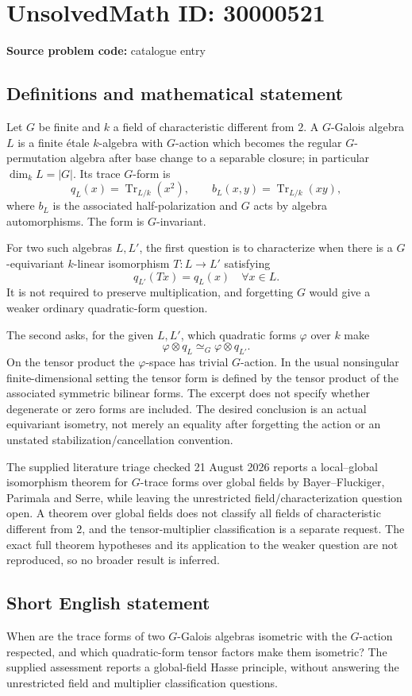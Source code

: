 \documentclass[11pt]{article}
\begin{document}
\section*{UnsolvedMath ID: 30000521}
\textbf{Source problem code:} catalogue entry
\subsection{Definitions and mathematical statement}
Let $G$ be finite and $k$ a field of characteristic different from $2$. A $G$-Galois algebra $L$ is a finite \'etale $k$-algebra with $G$-action which becomes the regular $G$-permutation algebra after base change to a separable closure; in particular $\dim_kL=|G|$. Its trace $G$-form is
\[
 q_L(x)=\operatorname{Tr}_{L/k}(x^2),
 \qquad b_L(x,y)=\operatorname{Tr}_{L/k}(xy),
\]
where $b_L$ is the associated half-polarization and $G$ acts by algebra automorphisms. The form is $G$-invariant.

For two such algebras $L,L'$, the first question is to characterize when there is a $G$-equivariant $k$-linear isomorphism $T:L\to L'$ satisfying
\[
 q_{L'}(T x)=q_L(x)\quad\forall x\in L.
\]
It is not required to preserve multiplication, and forgetting $G$ would give a weaker ordinary quadratic-form question.

The second asks, for the given $L,L'$, which quadratic forms $\varphi$ over $k$ make
\[
 \varphi\otimes q_L\simeq_G\varphi\otimes q_{L'}.
\]
On the tensor product the $\varphi$-space has trivial $G$-action. In the usual nonsingular finite-dimensional setting the tensor form is defined by the tensor product of the associated symmetric bilinear forms. The excerpt does not specify whether degenerate or zero forms are included. The desired conclusion is an actual equivariant isometry, not merely an equality after forgetting the action or an unstated stabilization/cancellation convention.

The supplied literature triage checked 21 August 2026 reports a local--global isomorphism theorem for $G$-trace forms over global fields by Bayer--Fluckiger, Parimala and Serre, while leaving the unrestricted field/characterization question open. A theorem over global fields does not classify all fields of characteristic different from $2$, and the tensor-multiplier classification is a separate request. The exact full theorem hypotheses and its application to the weaker question are not reproduced, so no broader result is inferred.
\subsection{Short English statement}
When are the trace forms of two $G$-Galois algebras isometric with the $G$-action respected, and which quadratic-form tensor factors make them isometric? The supplied assessment reports a global-field Hasse principle, without answering the unrestricted field and multiplier classification questions.
\end{document}
